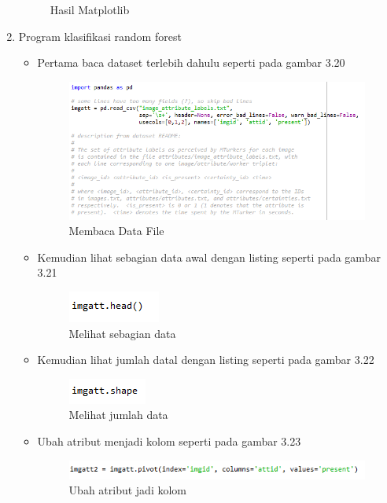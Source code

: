 \begin{enumerate}
\begin{figure}[ht]
	\caption{Hasil Matplotlib}
	\label{contoh}
	\end{figure}
\item Program klasifikasi random forest
	\begin{itemize}
		\item Pertama baca dataset terlebih dahulu seperti pada gambar 3.20
			\begin{figure}[ht]
			\centering
			\includegraphics[scale=0.7]{figures/PRF/4_1.png}
			\caption{Membaca Data File}
			\end{figure}
		\item Kemudian lihat sebagian data awal dengan listing seperti pada gambar 3.21
			\begin{figure}[ht]
			\centering
			\includegraphics[scale=0.9]{figures/PRF/4_2.png}
			\caption{Melihat sebagian data}
			\end{figure}
		\item Kemudian lihat jumlah datal dengan listing seperti pada gambar 3.22
			\begin{figure}[ht]
			\centering
			\includegraphics[scale=0.9]{figures/PRF/4_3.png}
			\caption{Melihat jumlah data}
			\end{figure}
		\item Ubah atribut menjadi kolom seperti pada gambar 3.23
			\begin{figure}[ht]
			\centering
			\includegraphics[scale=0.7]{figures/PRF/4_4.png}
			\caption{Ubah atribut jadi kolom}
			\end{figure}

\end{itemize}
\end{enumerate}
